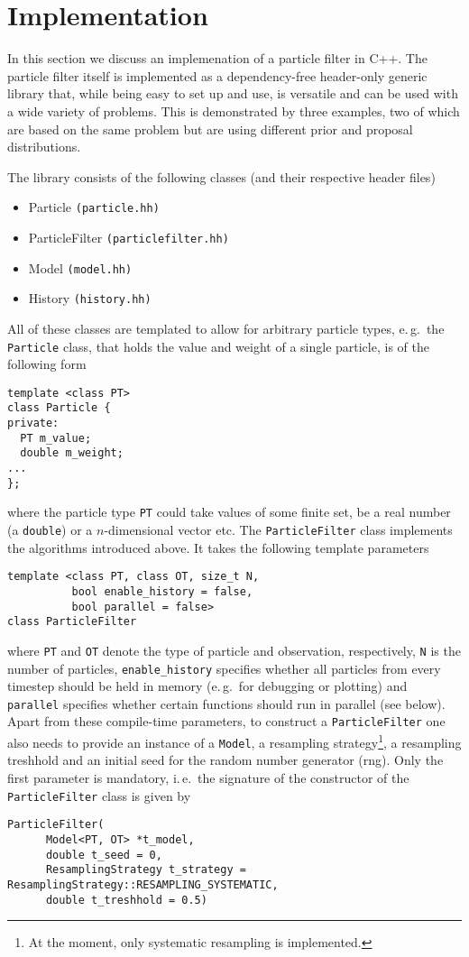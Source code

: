 \section*{Implementation}
In this section we discuss an implemenation of a particle filter in
C++. The particle filter itself is implemented as a dependency-free
header-only generic library that, while being easy to set up and use,
is versatile and can be used with a wide variety of problems. This is
demonstrated by three examples, two of which are based on the same
problem but are using different prior and proposal distributions.

The library consists of the following classes (and their respective
header files)
\begin{itemize}
\item Particle \texttt{(particle.hh)}
\item ParticleFilter \texttt{(particlefilter.hh)}
\item Model \texttt{(model.hh)}
\item History \texttt{(history.hh)}
\end{itemize}
All of these classes are templated to allow for arbitrary particle
types, e.\,g.\ the \texttt{Particle} class, that holds the value and
weight of a single particle, is of the following form
\begin{verbatim}
template <class PT> 
class Particle {
private:
  PT m_value;
  double m_weight;
...
}; 
\end{verbatim}
where the particle type \texttt{PT} could take values of some finite
set, be a real number (\ie a \texttt{double}) or a $n$-dimensional
vector etc. The \texttt{ParticleFilter} class implements the
algorithms introduced above. It takes the following template
parameters
\begin{verbatim}
template <class PT, class OT, size_t N, 
          bool enable_history = false,
          bool parallel = false>
class ParticleFilter
\end{verbatim}
where \texttt{PT} and \texttt{OT} denote the type of particle and
observation, respectively, \texttt{N} is the number of particles,
\texttt{enable\_history} specifies whether all particles from every
timestep should be held in memory (e.\,g.\ for debugging or plotting)
and \texttt{parallel} specifies whether certain functions should run
in parallel (see below). Apart from these compile-time parameters, to
construct a \texttt{ParticleFilter} one also needs to provide an
instance of a \texttt{Model}, a resampling strategy\footnote{At the
  moment, only systematic resampling is implemented.}, a resampling
treshhold and an initial seed for the random number generator
(rng). Only the first parameter is mandatory, i.\,e.\ the signature of
the constructor of the \texttt{ParticleFilter} class is given by
\begin{verbatim}
ParticleFilter(
      Model<PT, OT> *t_model,
      double t_seed = 0,
      ResamplingStrategy t_strategy = ResamplingStrategy::RESAMPLING_SYSTEMATIC,
      double t_treshhold = 0.5)
\end{verbatim}

